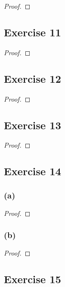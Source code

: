 \documentclass[14pt]{extarticle}
\begin{document}
\begin{proof}

\end{proof}

\subsection{Exercise 11}

\begin{proof}

\end{proof}

\subsection{Exercise 12}

\begin{proof}

\end{proof}

\subsection{Exercise 13}

\begin{proof}

\end{proof}

\subsection{Exercise 14}

\subsubsection{(a)}

\begin{proof}

\end{proof}

\subsubsection{(b)}

\begin{proof}

\end{proof}

\subsection{Exercise 15}
\end{document}
